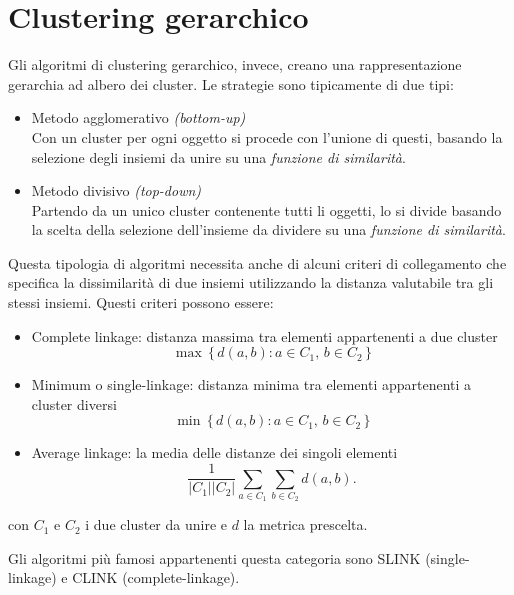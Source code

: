 \section{Clustering gerarchico}
	Gli algoritmi di clustering gerarchico, invece, creano una rappresentazione gerarchia ad albero dei cluster.
	Le strategie sono tipicamente di due tipi: 
	\begin{itemize}
		\item Metodo agglomerativo \emph{(bottom-up)} \\
		Con un cluster per ogni oggetto si procede con l'unione di questi, basando la selezione degli insiemi da unire su una \emph{funzione di similarità}.

		\item Metodo divisivo \emph{(top-down)} \\
		Partendo da un unico cluster contenente tutti li oggetti, lo si divide basando la scelta della selezione dell’insieme da dividere su una \emph{funzione di similarità}.
	\end{itemize}

	Questa tipologia di algoritmi necessita anche di alcuni criteri di collegamento che specifica la dissimilarità di due insiemi utilizzando la distanza valutabile tra gli stessi insiemi. Questi criteri possono essere: 
	\begin{itemize}
		\item Complete linkage: distanza massima tra elementi appartenenti a due cluster
			\begin{equation*}
				\max \, \{\, d(a,b) : a \in C_1,\, b \in C_2 \,\}
			\end{equation*}
		\item Minimum o single-linkage: distanza minima tra elementi appartenenti a cluster diversi
			\begin{equation*}
			 	\min \, \{\, d(a,b) : a \in C_1,\, b \in C_2 \,\}
			\end{equation*}

		\item Average linkage: la media delle distanze dei singoli elementi
			\begin{equation*}
				\frac{1}{|C_1| |C_2|} \sum_{a \in C_1 }\sum_{ b \in C_2} d(a,b). 
			\end{equation*}
	\end{itemize}
	con $C_1$ e $C_2$ i due cluster da unire e $d$ la metrica prescelta.

	Gli algoritmi più famosi appartenenti questa categoria sono SLINK (single-linkage) e CLINK (complete-linkage)\cite{clustering_gerarchico}.
